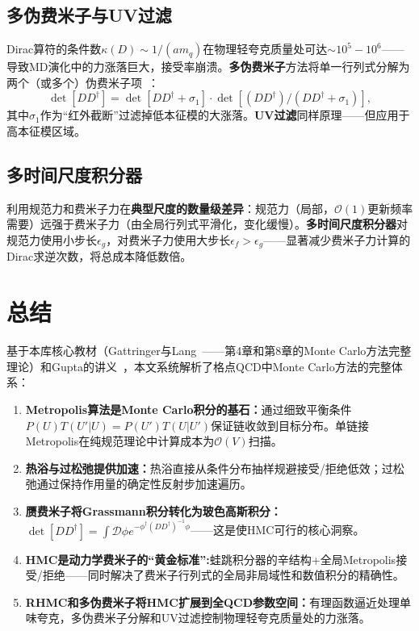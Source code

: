 \documentclass[12pt,a4paper]{ctexart}
\theoremstyle{definition}
\begin{document}
\subsection{多伪费米子与UV过滤}

Dirac算符的条件数$\kappa(D) \sim 1/(a m_q)$在物理轻夸克质量处可达$\sim 10^5-10^6$——导致MD演化中的力涨落巨大，接受率崩溃。\textbf{多伪费米子}方法将单一行列式分解为两个（或多个）伪费米子项~\cite{GattringerLang2010}：
\begin{equation}
\det[DD^\dagger] = \det[D D^\dagger + \sigma_1] \cdot \det[(DD^\dagger)/(DD^\dagger + \sigma_1)],
\label{eq:multi_pseudo}
\end{equation}
其中$\sigma_1$作为``红外截断''过滤掉低本征模的大涨落。\textbf{UV过滤}同样原理——但应用于高本征模区域。

\subsection{多时间尺度积分器}

利用规范力和费米子力在\textbf{典型尺度的数量级差异}：规范力（局部，$\mathcal{O}(1)$更新频率需要）远强于费米子力（由全局行列式平滑化，变化缓慢）。\textbf{多时间尺度积分器}对规范力使用小步长$\epsilon_g$，对费米子力使用大步长$\epsilon_f > \epsilon_g$——显著减少费米子力计算的Dirac求逆次数，将总成本降低数倍。

\section{总结}

基于本库核心教材（Gattringer与Lang~\cite{GattringerLang2010}——第4章和第8章的Monte Carlo方法完整理论）和Gupta的讲义~\cite{Gupta1997intro}，本文系统解析了格点QCD中Monte Carlo方法的完整体系：

\begin{enumerate}[leftmargin=*]
    \item \textbf{Metropolis算法是Monte Carlo积分的基石：}通过细致平衡条件$P(U)T(U'|U)=P(U')T(U|U')$保证链收敛到目标分布。单链接Metropolis在纯规范理论中计算成本为$\mathcal{O}(V)$扫描。
    \item \textbf{热浴与过松弛提供加速：}热浴直接从条件分布抽样规避接受/拒绝低效；过松弛通过保持作用量的确定性反射步加速遍历。
    \item \textbf{赝费米子将Grassmann积分转化为玻色高斯积分：}$\det[DD^\dagger] = \int \mathcal{D}\phi e^{-\phi^\dagger (DD^\dagger)^{-1}\phi}$——这是使HMC可行的核心洞察。
    \item \textbf{HMC是动力学费米子的``黄金标准'':}蛙跳积分器的辛结构+全局Metropolis接受/拒绝——同时解决了费米子行列式的全局非局域性和数值积分的精确性。
    \item \textbf{RHMC和多伪费米子将HMC扩展到全QCD参数空间：}有理函数逼近处理单味夸克，多伪费米子分解和UV过滤控制物理轻夸克质量处的力涨落。
\end{enumerate}
\end{document}
